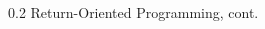 \documentclass[9pt]{beamer}
\begin{document}
\begin{frame}{0.2 Return-Oriented Programming, cont.}
\begin{columns}
\begin{column}{0.7\textwidth}
\begin{itemize}

\end{itemize}


\end{column}

\end{columns}
    
\end{frame}
\end{document}
